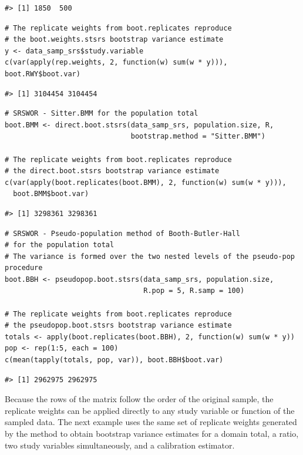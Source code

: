 \begin{verbatim}
#> [1] 1850  500
\end{verbatim}

\begin{verbatim}
# The replicate weights from boot.replicates reproduce 
# the boot.weights.stsrs bootstrap variance estimate
y <- data_samp_srs$study.variable
c(var(apply(rep.weights, 2, function(w) sum(w * y))), boot.RWY$boot.var)
\end{verbatim}

\begin{verbatim}
#> [1] 3104454 3104454
\end{verbatim}

\begin{verbatim}
# SRSWOR - Sitter.BMM for the population total
boot.BMM <- direct.boot.stsrs(data_samp_srs, population.size, R,
                              bootstrap.method = "Sitter.BMM")

# The replicate weights from boot.replicates reproduce 
# the direct.boot.stsrs bootstrap variance estimate
c(var(apply(boot.replicates(boot.BMM), 2, function(w) sum(w * y))),
  boot.BMM$boot.var)
\end{verbatim}

\begin{verbatim}
#> [1] 3298361 3298361
\end{verbatim}

\begin{verbatim}
# SRSWOR - Pseudo-population method of Booth-Butler-Hall
# for the population total
# The variance is formed over the two nested levels of the pseudo-pop procedure
boot.BBH <- pseudopop.boot.stsrs(data_samp_srs, population.size,
                                 R.pop = 5, R.samp = 100)

# The replicate weights from boot.replicates reproduce 
# the pseudopop.boot.stsrs bootstrap variance estimate
totals <- apply(boot.replicates(boot.BBH), 2, function(w) sum(w * y))
pop <- rep(1:5, each = 100)
c(mean(tapply(totals, pop, var)), boot.BBH$boot.var)
\end{verbatim}

\begin{verbatim}
#> [1] 2962975 2962975
\end{verbatim}

Because the rows of the matrix follow the order of the original sample, the replicate weights can be applied directly to any study variable or function of the sampled data. The next example uses the same set of replicate weights generated by the \citet{Rao:Wu:Yue:1992} method to obtain bootstrap variance estimates for a domain total, a ratio, two study variables simultaneously, and a calibration estimator.

